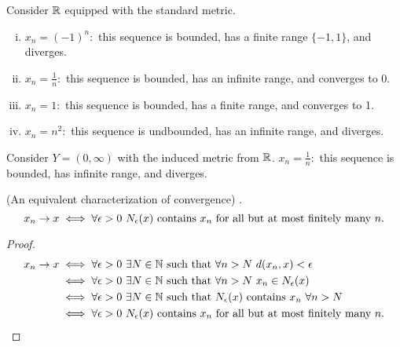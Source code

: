 \documentclass[a4paper]{article}
\begin{document}
    \begin{example}
        Consider $\mathbb{R}$ equipped with the standard metric.
        \begin{enumerate}[(i)]
            \item $x_n = (-1)^n:$ this sequence is bounded, has a finite range $\{-1, 1\}$, and diverges.
            \item $x_n = \frac{1}{n}:$ this sequence is bounded, has an infinite range, and converges to $0$.
            \item $x_n = 1:$ this sequence is bounded, has a finite range, and converges to 1.
            \item $x_n=n^2:$ this sequence is undbounded, has an infinite range, and diverges.
        \end{enumerate}
    \end{example}

    \begin{example}
        Consider $Y= (0, \infty)$ with the induced metric from $\mathbb{R}$.
        $x_n = \frac{1}{n}:$ this sequence is bounded, has infinite range, and diverges.
    \end{example}

    \begin{theorem}(An equivalent characterization of convergence)
        \routineMS.
        $$x_n \to x \iff \forall \epsilon > 0 ~N_{\epsilon}(x) \text{ contains $x_n$ for all but at most finitely many $n$.}$$
    \end{theorem}
    \begin{proof}
        \begin{align*}
            x_n \to x &\iff \forall \epsilon > 0 ~\exists N \in \mathbb{N} \text{ such that } \forall n > N ~d(x_n, x) < \epsilon \\
            &\iff \forall \epsilon > 0 ~\exists N \in \mathbb{N} \text{ such that } \forall n > N ~x_n \in N_{\epsilon}(x) \\
            &\iff \forall \epsilon > 0 ~\exists N \in \mathbb{N} \text{ such that } N_{\epsilon}(x) \text{ contains } x_n ~\forall n > N \\
            &\iff \forall \epsilon > 0 ~N_{\epsilon}(x) \text{ contains $x_n$ for all but at most finitely many $n$}.
        \end{align*}
    \end{proof}
\end{document}
